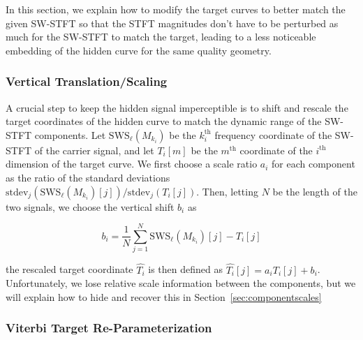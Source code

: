 \documentclass[runningheads]{llncs}
\begin{document}
In this section, we explain how to modify the target curves to better match the given SW-STFT so that the STFT magnitudes don't have to be perturbed as much for the SW-STFT to match the target, leading to a less noticeable embedding of the hidden curve for the same quality geometry.

\subsubsection{Vertical Translation/Scaling}

A crucial step to keep the hidden signal imperceptible is to shift and rescale the target coordinates of the hidden curve to match the dynamic range of the SW-STFT components.  Let $\text{SWS}_{\ell}\left({M_{k_i}}\right)$ be the $k_i^{\text{th}}$ frequency coordinate of the SW-STFT of the carrier signal, and let $T_i[m]$ be the $m^{\text{th}}$ coordinate of the $i^{\text{th}}$ dimension of the target curve.  We first choose a scale ratio $a_i$ for each component as the ratio of the standard deviations $\text{stdev}_j \left( \text{SWS}_{\ell} ({M_{k_i}})[j] \right) / \text{stdev}_j (T_i[j])$.  Then, letting $N$ be the length of the two signals, we choose the vertical shift $b_i$ as

\begin{equation}
  b_i = \frac{1}{N} \sum_{j=1}^N  \text{SWS}_{\ell} ({M_{k_i}})[j] - T_i[j]
\end{equation}

the rescaled target coordinate $\hat{T_i}$ is then defined as $\hat{T_i}[j] = a_i T_i[j] + b_i$.  Unfortunately, we lose relative scale information between the components, but we will explain how to hide and recover this in Section~\ref{sec:componentscales}

\subsubsection{Viterbi Target Re-Parameterization}
\end{document}
